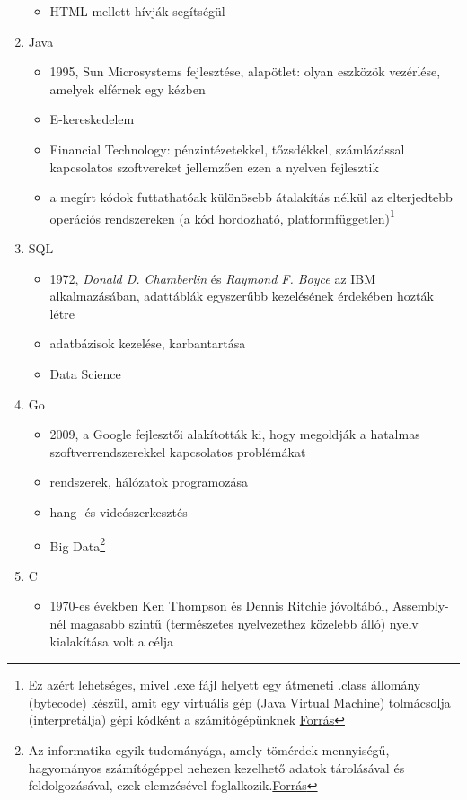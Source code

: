 \documentclass[tocnopagenum]{thesis-ekf}
\theoremstyle{definition}
\theoremstyle{remark}
\begin{document}
\begin{enumerate}
\begin{itemize}
			\item HTML mellett hívják segítségül
		\end{itemize}
		\item Java
		\begin{itemize}
			\item 1995, Sun Microsystems fejlesztése, alapötlet: olyan eszközök vezérlése, amelyek elférnek egy kézben
			\item E-kereskedelem
			\item Financial Technology: pénzintézetekkel, tőzsdékkel, számlázással kapcsolatos szoftvereket jellemzően ezen a nyelven fejlesztik
			\item a megírt kódok futtathatóak különösebb átalakítás nélkül az elterjedtebb operációs rendszereken (a kód hordozható, platformfüggetlen)\footnote{Ez azért lehetséges, mivel .exe fájl helyett egy átmeneti .class állomány (bytecode) készül, amit egy virtuális gép (Java Virtual Machine) tolmácsolja (interpretálja) gépi kódként a számítógépünknek \hyperref{https://www.upgrad.com/blog/why-is-java-platform-independent-language/}{}{}{Forrás}}
		\end{itemize}
		\item SQL
		\begin{itemize}
			\item 1972, \textit{Donald D. Chamberlin} és \textit{Raymond F. Boyce} az IBM alkalmazásában, adattáblák egyszerűbb kezelésének érdekében hozták létre
			\item adatbázisok kezelése, karbantartása
			\item Data Science
		\end{itemize}
		\item Go
		\begin{itemize}
			\item 2009, a Google fejlesztői alakították ki, hogy megoldják a hatalmas szoftverrendszerekkel kapcsolatos problémákat
			\item rendszerek, hálózatok programozása
			\item hang- és videószerkesztés
			\item Big Data\footnote{Az informatika egyik tudományága, amely tömérdek mennyiségű, hagyományos számítógéppel nehezen kezelhető adatok tárolásával és feldolgozásával, ezek elemzésével foglalkozik.\hyperref{{https://www.youtube.com/watch?v=bAyrObl7TYE}}{}{}{Forrás}}
		\end{itemize}
		\item C
		\begin{itemize}
			\item 1970-es években Ken Thompson és Dennis Ritchie jóvoltából, Assembly-nél magasabb szintű (természetes nyelvezethez közelebb álló) nyelv kialakítása volt a célja

\end{itemize}
\end{enumerate}
\end{document}
